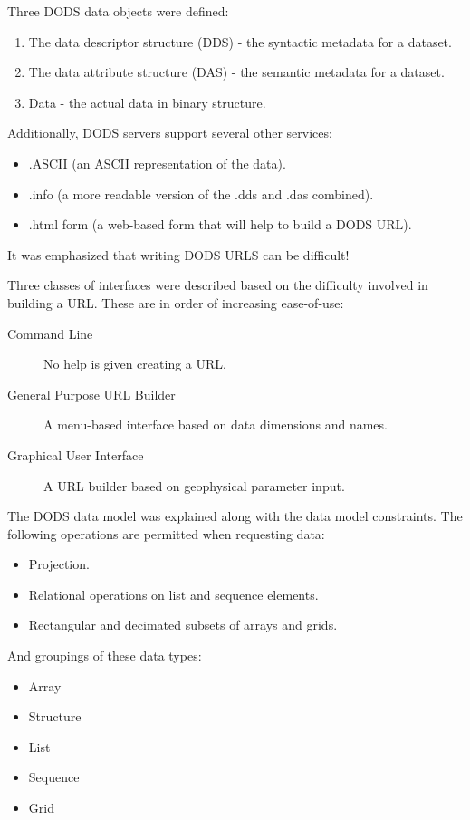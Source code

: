 Three DODS data objects were defined:
\begin{enumerate}
\item The data descriptor structure (DDS) - the syntactic metadata for a dataset.
\item The data attribute structure (DAS) - the semantic metadata for a dataset.
\item Data - the actual data in binary structure.
\end{enumerate}

Additionally, DODS servers support several other services: 
\begin{itemize}
\item .ASCII (an ASCII representation of the data).
\item .info (a more readable version of the .dds and .das combined).
\item .html form (a web-based form that will help to build a DODS URL).
\end{itemize}

It was emphasized that writing DODS URLS can be difficult!

Three classes of interfaces were described based on the difficulty
involved in building a URL.  These are in order of increasing
ease-of-use:

\begin{description}
\item[Command Line] No help is given creating a URL.
\item[General Purpose URL Builder] A menu-based interface based on
  data dimensions and names.
\item[Graphical User Interface] A URL builder based on geophysical
  parameter input.
\end{description}

The DODS data model was explained along with the data model
constraints.  The following operations are permitted when requesting
data:
\begin{itemize}
\item Projection.
\item Relational operations on list and sequence elements.
\item Rectangular and decimated subsets of arrays and grids.
\end{itemize}

And groupings of these data types:
\begin{itemize}
\item Array
\item Structure
\item List
\item Sequence 
\item Grid
\end{itemize}

